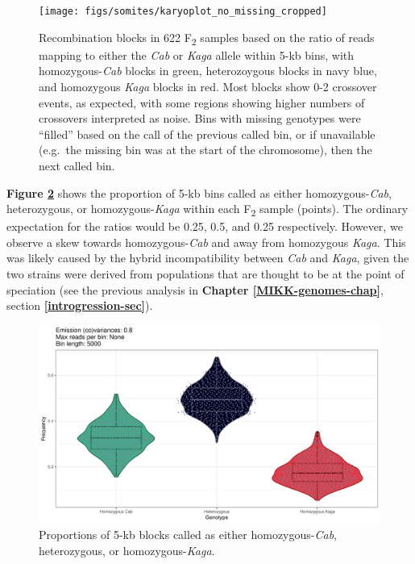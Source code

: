 \documentclass[
]{book}
\begin{document}
\begin{figure}
\texttt{[image: figs/somites/karyoplot\_no\_missing\_cropped]} \caption{Recombination blocks in 622 F\textsubscript{2} samples based on the ratio of reads mapping to either the \emph{Cab} or \emph{Kaga} allele within 5-kb bins, with homozygous-\emph{Cab} blocks in green, heterozoygous blocks in navy blue, and homozygous \emph{Kaga} blocks in red. Most blocks show 0-2 crossover events, as expected, with some regions showing higher numbers of crossovers interpreted as noise. Bins with missing genotypes were ``filled'' based on the call of the previous called bin, or if unavailable (e.g.~the missing bin was at the start of the chromosome), then the next called bin.}\label{fig:karyo-no-missing}
\end{figure}

\textbf{Figure \ref{fig:prop-sites-total}} shows the proportion of 5-kb bins called as either homozygous-\emph{Cab}, heterozygous, or homozygous-\emph{Kaga} within each F\textsubscript{2} sample (points). The ordinary expectation for the ratios would be 0.25, 0.5, and 0.25 respectively. However, we observe a skew towards homozygous-\emph{Cab} and away from homozygous \emph{Kaga}. This was likely caused by the hybrid incompatibility between \emph{Cab} and \emph{Kaga}, given the two strains were derived from populations that are thought to be at the point of speciation (see the previous analysis in \textbf{Chapter \ref{MIKK-genomes-chap}}, section \textbf{\ref{introgression-sec}}).



\begin{figure}
\includegraphics[width=1\linewidth]{figs/somites/prop_sites_total} \caption{Proportions of 5-kb blocks called as either homozygous-\emph{Cab}, heterozygous, or homozygous-\emph{Kaga}.}\label{fig:prop-sites-total}
\end{figure}
\end{document}
